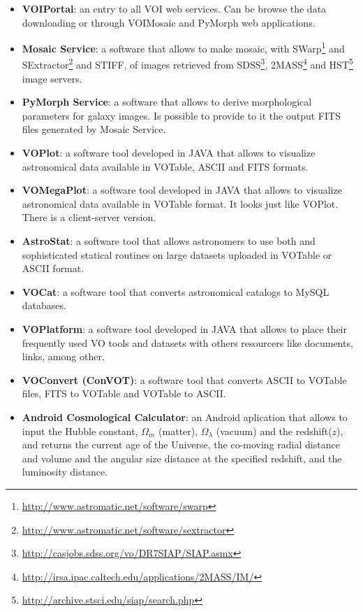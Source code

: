 \begin{itemize}
\item \textbf{VOIPortal}:
an entry to all VOI web services. Can be browse the data downloading or through
VOIMosaic and PyMorph web applications.

\item \textbf{Mosaic Service}:
a software that allows to make mosaic, with
SWarp\footnote{\url{http://www.astromatic.net/software/swarp}} and
SExtractor\footnote{\url{http://www.astromatic.net/software/sextractor}} and
STIFF, of images retrieved from
SDSS\footnote{\url{http://casjobs.sdss.org/vo/DR7SIAP/SIAP.asmx}},
2MASS\footnote{\url{http://irsa.ipac.caltech.edu/applications/2MASS/IM/}} and
HST\footnote{\url{http://archive.stsci.edu/siap/search.php}} image servers.

\item \textbf{PyMorph Service}:
a software that allows to derive morphological parameters for galaxy images. Is
possible to provide to it the output FITS files generated by Mosaic Service.

\item \textbf{VOPlot}:
a software tool developed in JAVA that allows to visualize astronomical data
available in VOTable, ASCII and FITS formats.

\item \textbf{VOMegaPlot}:
a software tool developed in JAVA that allows to visualize astronomical data
available in VOTable format. It looks just like VOPlot. There is a client-server
version.

\item \textbf{AstroStat}:
a software tool that allows astronomers to use both and sophisticated statical
routines on large datasets uploaded in VOTable or ASCII format.

\item \textbf{VOCat}:
a software tool that converts astronomical catalogs to MySQL databases. 

\item \textbf{VOPlatform}:
a software tool developed in JAVA that allows to place their frequently used VO
tools and datasets with others resourcers like documents, links, among other.

\item \textbf{VOConvert (ConVOT)}:
a software tool that converts ASCII to VOTable files, FITS to VOTable and
VOTable to ASCII.

\item \textbf{Android Cosmological Calculator}:
an Android aplication that allows to input the Hubble constant, $ \Omega_{m} $
(matter), $ \Omega_{\lambda} $ (vacuum) and the redshift($ z $), and returns the
current age of the Universe, the co-moving radial distance and volume and the
angular size distance at the specified redshift, and the luminosity distance.


\end{itemize}
